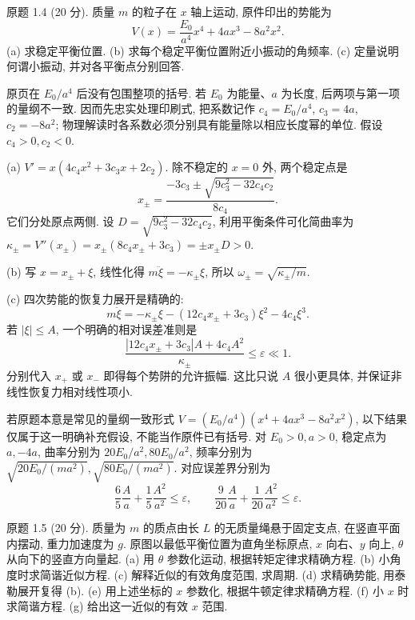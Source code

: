 \begin{exercise}\label{ps:1.4}
原题 1.4 (20 分). 质量 $m$ 的粒子在 $x$ 轴上运动, 原件印出的势能为
\[
V(x)=\frac{E_0}{a^4}x^4+4ax^3-8a^2x^2.
\]
(a) 求稳定平衡位置. (b) 求每个稳定平衡位置附近小振动的角频率. (c) 定量说明何谓小振动, 并对各平衡点分别回答.
\end{exercise}
\begin{solution}
原页在 $E_0/a^4$ 后没有包围整项的括号. 若 $E_0$ 为能量、$a$ 为长度, 后两项与第一项的量纲不一致. 因而先忠实处理印刷式, 把系数记作 $c_4=E_0/a^4$, $c_3=4a$, $c_2=-8a^2$; 物理解读时各系数必须分别具有能量除以相应长度幂的单位. 假设 $c_4>0,c_2<0$.

(a) $V'=x(4c_4x^2+3c_3x+2c_2)$. 除不稳定的 $x=0$ 外, 两个稳定点是
\[
x_\pm=\frac{-3c_3\pm\sqrt{9c_3^2-32c_4c_2}}{8c_4}.
\]
它们分处原点两侧. 设 $D=\sqrt{9c_3^2-32c_4c_2}$, 利用平衡条件可化简曲率为 $\kappa_\pm=V''(x_\pm)=x_\pm(8c_4x_\pm+3c_3)=\pm x_\pm D>0$.

(b) 写 $x=x_\pm+\xi$, 线性化得 $m\ddot\xi=-\kappa_\pm\xi$, 所以 $\omega_\pm=\sqrt{\kappa_\pm/m}$.

(c) 四次势能的恢复力展开是精确的:
\[
m\ddot\xi=-\kappa_\pm\xi-(12c_4x_\pm+3c_3)\xi^2-4c_4\xi^3.
\]
若 $|\xi|\le A$, 一个明确的相对误差准则是
\[
\frac{|12c_4x_\pm+3c_3|A+4c_4A^2}{\kappa_\pm}\le\varepsilon\ll1.
\]
分别代入 $x_+$ 或 $x_-$ 即得每个势阱的允许振幅. 这比只说 $A$ 很小更具体, 并保证非线性恢复力相对线性项小.

若原题本意是常见的量纲一致形式 $V=(E_0/a^4)(x^4+4ax^3-8a^2x^2)$, 以下结果仅属于这一明确补充假设, 不能当作原件已有括号. 对 $E_0>0,a>0$, 稳定点为 $a,-4a$, 曲率分别为 $20E_0/a^2,80E_0/a^2$, 频率分别为 $\sqrt{20E_0/(ma^2)},\sqrt{80E_0/(ma^2)}$. 对应误差界分别为
\[
\frac65\frac A a+\frac15\frac{A^2}{a^2}\le\varepsilon,\qquad
\frac9{20}\frac A a+\frac1{20}\frac{A^2}{a^2}\le\varepsilon.
\]
\end{solution}
\begin{exercise}\label{ps:1.5}
原题 1.5 (20 分). 质量为 $m$ 的质点由长 $L$ 的无质量绳悬于固定支点, 在竖直平面内摆动, 重力加速度为 $g$. 原图以最低平衡位置为直角坐标原点, $x$ 向右、$y$ 向上, $\theta$ 从向下的竖直方向量起. (a) 用 $\theta$ 参数化运动, 根据转矩定律求精确方程. (b) 小角度时求简谐近似方程. (c) 解释近似的有效角度范围, 求周期. (d) 求精确势能, 用泰勒展开复得 (b). (e) 用上述坐标的 $x$ 参数化, 根据牛顿定律求精确方程. (f) 小 $x$ 时求简谐方程. (g) 给出这一近似的有效 $x$ 范围.
\end{exercise}
